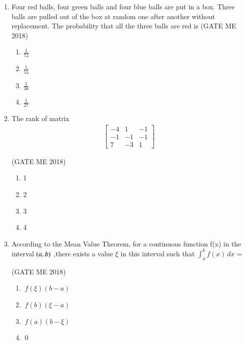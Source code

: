 \documentclass[journal]{IEEEtran}
\numberwithin{equation}{enumi}
\numberwithin{figure}{enumi}
\begin{document}
\begin{enumerate}
\item Four red balls, four green balls and four blue balls are put in a box. Three balls are pulled out of the box at random one after another without replacement. The probability that all the three balls are red is
  \hfill{(GATE ME 2018)}
  
\begin{multicols}{4}
  \begin{enumerate}
    \item $\frac{1}{72}$
    \item $\frac{1}{55}$
    \item $\frac{1}{36}$
    \item $\frac{1}{27}$
\end{enumerate}
\end{multicols}
 
\item The rank of matrix 
 \begin{align}
\begin{bmatrix}
-4 & 1 & -1 \\
-1 & -1 & -1 \\
7 & -3 & 1
\end{bmatrix}
\end{align}

  \hfill{(GATE ME 2018)}
  
\begin{multicols}{4}
\begin{enumerate}
      \item 1
     \item 2
     \item 3
     \item 4
    \end{enumerate}
\end{multicols}

\item According to the Mean Value Theorem, for a continuous function f(x) in the interval $\left(a,b\right)$ ,there exists a value $\xi$ in this interval such that $\int_{a}^{b} f(x)\,dx$ =

  \hfill{(GATE ME 2018)}
  
\begin{multicols}{2}
\begin{enumerate}
    \item  $ \ f(\xi)(b - a) $
    \item $\ f(b)(\xi - a)$\\ 
    \item $\ f(a)(b - \xi)$ \quad 
    \item $\ 0 $
\end{enumerate}   
\end{multicols}


\end{enumerate}
\end{document}

